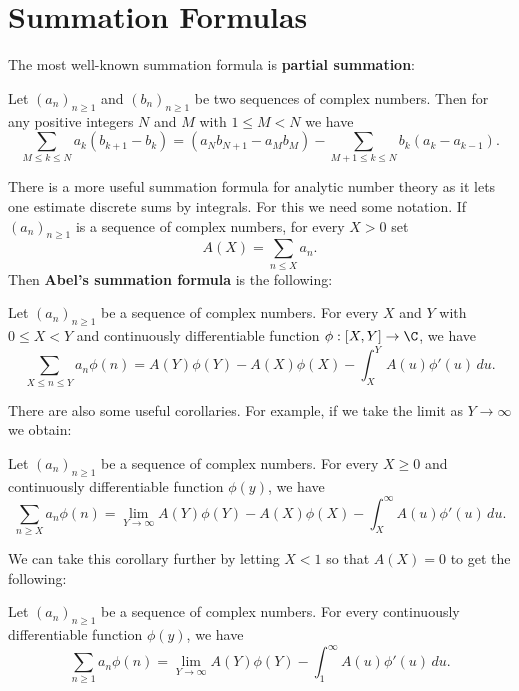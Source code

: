   \section{Summation Formulas}\label{append:Summation_Formulas}
    The most well-known summation formula is \textbf{partial summation}:

    \begin{theorem}\label{thm:partial_summation}
      Let $(a_{n})_{n \ge 1}$ and $(b_{n})_{n \ge 1}$ be two sequences of complex numbers. Then for any positive integers $N$ and $M$ with $1 \le M < N$ we have
      \[
        \sum_{M \le k \le N}a_{k}(b_{k+1}-b_{k}) = (a_{N}b_{N+1}-a_{M}b_{M})-\sum_{M+1 \le k \le N}b_{k}(a_{k}-a_{k-1}).
      \]
    \end{theorem}
    
    There is a more useful summation formula for analytic number theory as it lets one estimate discrete sums by integrals. For this we need some notation. If $(a_{n})_{n \ge 1}$ is a sequence of complex numbers, for every $X > 0$ set
    \[
        A(X) = \sum_{n \le X}a_{n}.
    \]
    Then \textbf{Abel's summation formula} is the following:

    \begin{theorem}
      Let $(a_{n})_{n \ge 1}$ be a sequence of complex numbers. For every $X$ and $Y$ with $0 \le X < Y$ and continuously differentiable function $\phi:[X,Y] \to \C$, we have
      \[
        \sum_{X \le n \le Y}a_{n}\phi(n) = A(Y)\phi(Y)-A(X)\phi(X)-\int_{X}^{Y}A(u)\phi'(u)\,du.
      \]
    \end{theorem}

    There are also some useful corollaries. For example, if we take the limit as $Y \to \infty$ we obtain:

    \begin{corollary}\label{cor:Abels_summation_formula_limit_version}
      Let $(a_{n})_{n \ge 1}$ be a sequence of complex numbers. For every $X \ge 0$ and continuously differentiable function $\phi(y)$, we have
      \[
        \sum_{n \ge X}a_{n}\phi(n) = \lim_{Y \to \infty}A(Y)\phi(Y)-A(X)\phi(X)-\int_{X}^{\infty}A(u)\phi'(u)\,du.
      \]
    \end{corollary}

    We can take this corollary further by letting $X < 1$ so that $A(X) = 0$ to get the following:

    \begin{corollary}\label{cor:Abels_summation_formula_limit_version_specialization}
      Let $(a_{n})_{n \ge 1}$ be a sequence of complex numbers. For every continuously differentiable function $\phi(y)$, we have
      \[
        \sum_{n \ge 1}a_{n}\phi(n) = \lim_{Y \to \infty}A(Y)\phi(Y)-\int_{1}^{\infty}A(u)\phi'(u)\,du.
      \]
    \end{corollary}
